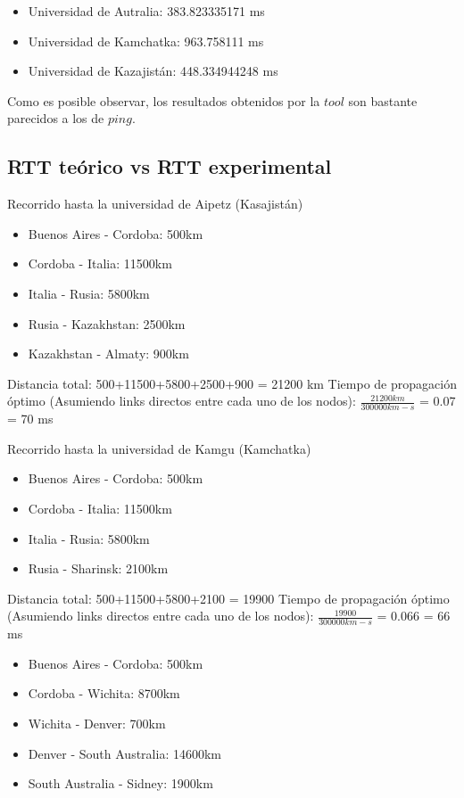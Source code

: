\begin{itemize}
	\item Universidad de Autralia: 383.823335171 ms
	\item Universidad de Kamchatka: 963.758111 ms
	\item Universidad de Kazajistán: 448.334944248 ms
\end{itemize}

Como es posible observar, los resultados obtenidos por la $tool$ son bastante parecidos a los de $ping$.

\subsection{RTT teórico vs RTT experimental}

Recorrido hasta la universidad de Aipetz (Kasajistán)

\begin{itemize}
	\item Buenos Aires - Cordoba: 500km
	\item Cordoba - Italia: 11500km
	\item Italia - Rusia: 5800km
	\item Rusia - Kazakhstan: 2500km
	\item Kazakhstan - Almaty:  900km
\end{itemize}

Distancia total: 500+11500+5800+2500+900 = 21200 km
Tiempo de propagación óptimo (Asumiendo links directos entre cada uno de los nodos):
$\frac{21200km}{300000km-s}$ = 0.07 = 70 ms


Recorrido hasta la universidad de Kamgu (Kamchatka)

\begin{itemize}
	\item Buenos Aires - Cordoba: 500km
	\item Cordoba - Italia: 11500km
	\item Italia - Rusia: 5800km
	\item Rusia - Sharinsk:  2100km
\end{itemize}

Distancia total: 500+11500+5800+2100 = 19900
Tiempo de propagación óptimo (Asumiendo links directos entre cada uno de los nodos):
$\frac{19900}{300000km-s}$ = 0.066 = 66 ms


\begin{itemize}
	\item Buenos Aires - Cordoba: 500km
	\item Cordoba - Wichita: 8700km
	\item Wichita - Denver: 700km
	\item Denver - South Australia: 14600km
	\item South Australia - Sidney:  1900km
\end{itemize}

